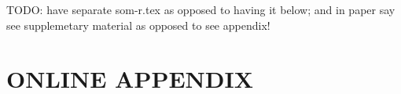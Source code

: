 \documentclass[10pt, letterpaper]{article}
\begin{document}
\begin{spacing}{1.4}




TODO: have separate som-r.tex as opposed to having it below; and in paper say
see supplemetary material as opposed to see appendix!
 \section*{\Huge ONLINE APPENDIX}






\end{spacing}
\end{document}

